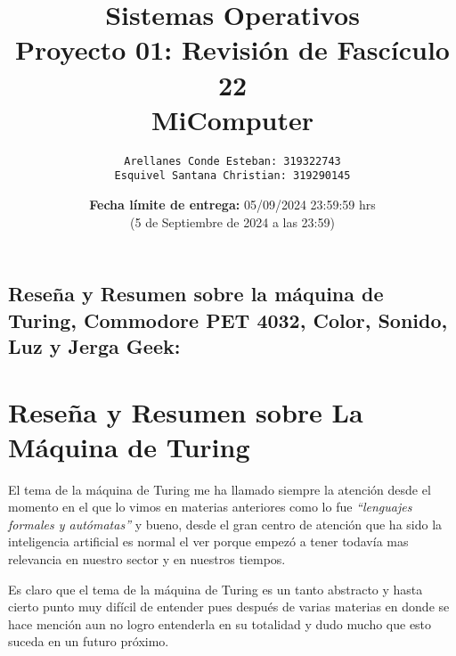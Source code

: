 \documentclass[letterpaper, 12 pt]{article} %
\begin{document}

\title{\textbf{Sistemas Operativos} \\ Proyecto 01: Revisión de Fascículo 22 \\ MiComputer\\ } 

\author{
  \normalsize{\texttt{Arellanes Conde Esteban: 319322743}} \\
  \normalsize{\texttt{Esquivel Santana Christian: 319290145}} \\
}
\date{\normalsize{\textbf{Fecha límite de entrega:} 05/09/2024 23:59:59 hrs \\ (5 de Septiembre de 2024 a las 23:59)}}
\maketitle
\thispagestyle{fancy}

\begin{center}
\section*{Reseña y Resumen sobre la máquina de Turing, Commodore PET 4032, Color, Sonido, Luz y Jerga Geek:}
\end{center}

\section*{Reseña y Resumen sobre La Máquina de Turing}
El tema de la máquina de Turing me ha llamado siempre la atención desde el momento en el que lo vimos en materias anteriores como lo fue \textit{“lenguajes formales y autómatas”} y bueno, desde el gran centro de atención que ha sido la inteligencia artificial es normal el ver porque empezó a tener todavía mas relevancia en nuestro sector y en nuestros tiempos. 

Es claro que el tema de la máquina de Turing es un tanto abstracto y hasta cierto punto muy difícil de entender pues después de varias materias en donde se hace mención aun no logro entenderla en su totalidad y dudo mucho que esto suceda en un futuro próximo.
\end{document}
